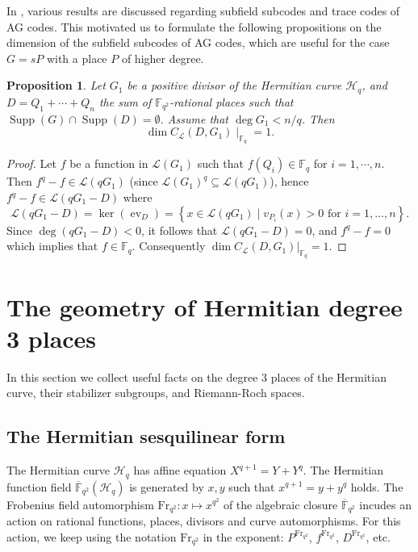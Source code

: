 \documentclass[11pt]{amsart}
\theoremstyle{plain}
\newtheorem{proposition}[theorem]{Proposition}
\theoremstyle{definition}
\theoremstyle{remark}
\newcommand{\Frob}{{\mathrm{Fr}_{q^2}}}
\newcommand{\Supp}{\operatorname{Supp}}
\begin{document}
In \cite[Chapter~9]{stichtenoth2009algebraic}, various results are discussed regarding subfield subcodes and trace codes of AG codes. This motivated us to formulate the following propositions on the  dimension of the subfield subcodes of AG codes, which are useful for the case $G=sP$ with a place $P$ of higher degree.


\begin{proposition} \label{prop:sub}
	Let $G_1$ be a positive divisor of the Hermitian curve $\mathscr{H}_q$, and $D=Q_1+\cdots+Q_n$ the sum of $\mathbb{F}_{q^2}$-rational places such that $\Supp(G)\cap \Supp(D)=\emptyset$. Assume that $\deg G_1 < n/q$. Then 
	\[
	\dim C_{\mathcal{L}}(D,G_1) \mid_{\mathbb{F}_q} = 1.
	\]
\end{proposition}
\begin{proof}
	Let $f$ be a function in $\mathscr{L}(G_1)$ such that $f(Q_i) \in \mathbb{F}_q$ for $i=1,\cdots,n$. Then $f^q -f \in \mathscr{L}(qG_1)$ (since $\mathscr{L}(G_1)^q \subseteq \mathscr{L}(qG_1)$), hence $f^q - f \in  \mathscr{L}(qG_1-D)$ where
	\[\mathscr{L}(qG_1-D) = \ker \left(\operatorname{ev}_{D}\right)=\left\{x \in \mathscr{L}(qG_1) \mid v_{P_i}(x)>0 \text { for } i=1, \ldots, n\right\} .\]
	Since $\deg(qG_1-D)<0$, it follows that $\mathscr{L}(qG_1 - D)=0$, and  $f^q -f =0$ which implies that $f \in \mathbb{F}_q$. Consequently $\dim C_{\mathcal{L}}(D,G_1)|_{ \mathbb{F}_q}= 1$.
\end{proof}






\section{The geometry of Hermitian degree 3 places} \label{sec:geometry}

In this section we collect useful facts on the degree 3 places of the Hermitian curve, their stabilizer subgroups, and Riemann-Roch spaces. 

\subsection{The Hermitian sesquilinear form} \label{ssec:h-form}
The Hermitian curve $\mathscr{H}_q$ has affine equation $X^{q+1}=Y+Y^q$. The Hermitian function field $\overline{\mathbb{F}}_{q^2}(\mathscr{H}_q)$ is generated by $x,y$ such that $x^{q+1}=y+y^q$ holds. The Frobenius field automorphism $\Frob:x\mapsto x^{q^2}$ of the algebraic closure $\overline{\mathbb{F}}_{q^2}$ incudes an action on rational functions, places, divisors and curve automorphisms. For this action, we keep using the notation $\Frob$ in the exponent: $P^\Frob$, $f^\Frob$, $D^\Frob$, etc. 
\end{document}
